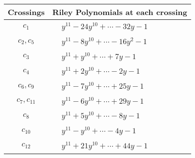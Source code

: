 \documentclass[1p]{elsarticle_modified}
\theoremstyle{definition}
\begin{document}
\begin{tabular}{m{50pt}|m{274pt}}
Crossings & \hspace{64pt}Riley Polynomials at each crossing \\
\hline $$\begin{aligned}c_{1}\end{aligned}$$&$\begin{aligned}
&y^{11}-24 y^{10}+\cdots-32 y-1
\end{aligned}$\\
\hline $$\begin{aligned}c_{2},c_{5}\end{aligned}$$&$\begin{aligned}
&y^{11}-8 y^{10}+\cdots-16 y^2-1
\end{aligned}$\\
\hline $$\begin{aligned}c_{3}\end{aligned}$$&$\begin{aligned}
&y^{11}+y^{10}+\cdots+7 y-1
\end{aligned}$\\
\hline $$\begin{aligned}c_{4}\end{aligned}$$&$\begin{aligned}
&y^{11}+2 y^{10}+\cdots-2 y-1
\end{aligned}$\\
\hline $$\begin{aligned}c_{6},c_{9}\end{aligned}$$&$\begin{aligned}
&y^{11}-7 y^{10}+\cdots+25 y-1
\end{aligned}$\\
\hline $$\begin{aligned}c_{7},c_{11}\end{aligned}$$&$\begin{aligned}
&y^{11}-6 y^{10}+\cdots+29 y-1
\end{aligned}$\\
\hline $$\begin{aligned}c_{8}\end{aligned}$$&$\begin{aligned}
&y^{11}+5 y^{10}+\cdots-8 y-1
\end{aligned}$\\
\hline $$\begin{aligned}c_{10}\end{aligned}$$&$\begin{aligned}
&y^{11}- y^{10}+\cdots-4 y-1
\end{aligned}$\\
\hline $$\begin{aligned}c_{12}\end{aligned}$$&$\begin{aligned}
&y^{11}+21 y^{10}+\cdots+44 y-1
\end{aligned}$\\
\hline
\end{tabular}\\~\\
\end{document}
